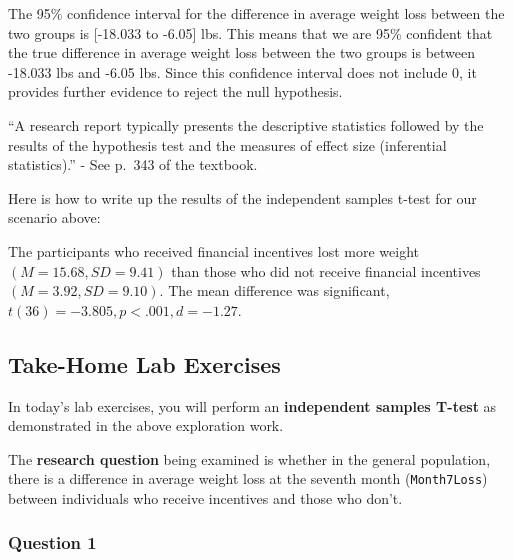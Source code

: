 \documentclass[
  letterpaper,
  DIV=11,
  numbers=noendperiod]{scrartcl}
\begin{document}
The 95\% confidence interval for the difference in average weight loss
between the two groups is {[}-18.033 to -6.05{]} lbs. This means that we
are 95\% confident that the true difference in average weight loss
between the two groups is between -18.033 lbs and -6.05 lbs. Since this
confidence interval does not include 0, it provides further evidence to
reject the null hypothesis.

\begin{tcolorbox}[enhanced jigsaw, opacityback=0, colbacktitle=quarto-callout-tip-color!10!white, colframe=quarto-callout-tip-color-frame, leftrule=.75mm, bottomtitle=1mm, titlerule=0mm, title=\textcolor{quarto-callout-tip-color}{\faLightbulb}\hspace{0.5em}{APA-style Write-up}, opacitybacktitle=0.6, toptitle=1mm, colback=white, bottomrule=.15mm, rightrule=.15mm, breakable, arc=.35mm, toprule=.15mm, left=2mm, coltitle=black]

``A research report typically presents the descriptive statistics
followed by the results of the hypothesis test and the measures of
effect size (inferential statistics).'' - See p.~343 of the textbook.

Here is how to write up the results of the independent samples t-test
for our scenario above:

The participants who received financial incentives lost more weight
\((M = 15.68, SD = 9.41)\) than those who did not receive financial
incentives \((M = 3.92, SD = 9.10)\). The mean difference was
significant, \(t(36) = -3.805, p < .001, d = -1.27\).

\end{tcolorbox}

\subsection{Take-Home Lab Exercises}\label{take-home-lab-exercises}

In today's lab exercises, you will perform an \textbf{independent
samples T-test} as demonstrated in the above exploration work.

The \textbf{research question} being examined is whether in the general
population, there is a difference in average weight loss at the seventh
month (\texttt{Month7Loss}) between individuals who receive incentives
and those who don't.

\subsubsection{Question 1}\label{question-1}
\end{document}
